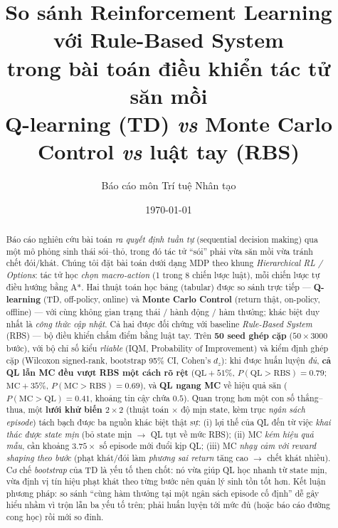 \documentclass[11pt,a4paper]{article}
\title{\textbf{So sánh Reinforcement Learning với Rule-Based System\\
trong bài toán điều khiển tác tử săn mồi}\\[2mm]
\large Q-learning (TD) \emph{vs} Monte Carlo Control \emph{vs} luật tay (RBS)}
\author{Báo cáo môn Trí tuệ Nhân tạo}
\date{\today}
\begin{document}
\maketitle

\begin{abstract}
\noindent
Báo cáo nghiên cứu bài toán \emph{ra quyết định tuần tự} (sequential decision making) qua một
mô phỏng sinh thái sói--thỏ, trong đó tác tử ``sói'' phải vừa săn mồi vừa tránh chết đói/khát.
Chúng tôi đặt bài toán dưới dạng MDP theo khung \emph{Hierarchical RL / Options}: tác tử học
\emph{chọn macro-action} (1 trong 8 chiến lược luật), mỗi chiến lược tự điều hướng bằng A*. Hai
thuật toán học bảng (tabular) được so sánh trực tiếp --- \textbf{Q-learning} (TD, off-policy,
online) và \textbf{Monte Carlo Control} (return thật, on-policy, offline) --- với cùng không
gian trạng thái / hành động / hàm thưởng; khác biệt duy nhất là \emph{công thức cập nhật}. Cả
hai được đối chứng với baseline \emph{Rule-Based System} (RBS) --- bộ điều khiển chấm điểm bằng
luật tay. Trên \textbf{50 seed
ghép cặp} ($50 \times 3000$ bước), với bộ chỉ số kiểu \emph{rliable} (IQM, Probability of
Improvement) và kiểm định ghép cặp (Wilcoxon signed-rank, bootstrap 95\% CI, Cohen's $d_z$):
khi được huấn luyện \emph{đủ}, \textbf{cả QL lẫn MC đều vượt RBS một cách rõ rệt}
($\text{QL}+51\%$, $P(\text{QL}>\text{RBS})=0.79$; $\text{MC}+35\%$, $P(\text{MC}>\text{RBS})=0.69$),
và \textbf{QL ngang MC} về hiệu quả săn ($P(\text{MC}>\text{QL})=0.41$, khoảng tin cậy chứa $0.5$).
Quan trọng hơn một con số thắng--thua, một \textbf{lưới khử biến $2\times 2$} (thuật toán $\times$ độ
mịn state, kèm trục \emph{ngân sách episode}) tách bạch được ba nguồn khác biệt thật sự: (i) lợi thế
của QL đến từ việc \emph{khai thác được state mịn} (bỏ state mịn $\to$ QL tụt về mức RBS); (ii) MC
\emph{kém hiệu quả mẫu}, cần khoảng $3.75\times$ số episode mới đuổi kịp QL; (iii) MC \emph{nhạy cảm
với reward shaping theo bước} (phạt khát/đói làm \emph{phương sai return} tăng cao $\to$ chết khát
nhiều). Cơ chế \emph{bootstrap} của TD là yếu tố then chốt: nó vừa giúp QL học nhanh từ state mịn,
vừa định vị tín hiệu phạt khát theo từng bước nên quản lý sinh tồn tốt hơn. Kết luận phương pháp:
so sánh ``cùng hàm thưởng tại một ngân sách episode cố định'' dễ gây hiểu nhầm vì trộn lẫn ba yếu
tố trên; phải huấn luyện tới mức đủ (hoặc báo cáo đường cong học) rồi mới so đỉnh.
\end{abstract}

\tableofcontents
\bigskip

\end{document}
